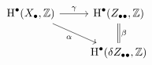 \documentclass[crop,dvisvgm]{standalone}
\begin{document}
\[\begin {tikzcd}
    \operatorname {H}^\bullet (X_\bullet ,\mathbb {Z})
      \ar [r,"\gamma "]
      \ar [dr,swap,"\alpha "]
    & \operatorname {H}^\bullet (Z_{\bullet \bullet },\mathbb {Z})
      \ar [d,equal,"\beta "]
  \\& \operatorname {H}^\bullet (\delta  Z_{\bullet \bullet },\mathbb {Z})
  \end {tikzcd}\]
\end{document}

